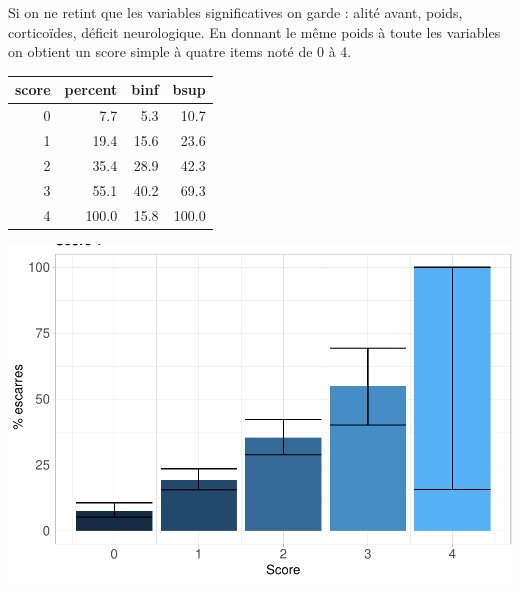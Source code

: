 \documentclass[a4paper, french]{article}
\begin{document}
Si on ne retint que les variables significatives on garde : alité avant,
poids, corticoïdes, déficit neurologique. En donnant le même poids à
toute les variables on obtient un score simple à quatre items noté de 0
à 4.

\begin{longtable}[]{@{}rrrr@{}}
\toprule
score & percent & binf & bsup\tabularnewline
\midrule
\endhead
0 & 7.7 & 5.3 & 10.7\tabularnewline
1 & 19.4 & 15.6 & 23.6\tabularnewline
2 & 35.4 & 28.9 & 42.3\tabularnewline
3 & 55.1 & 40.2 & 69.3\tabularnewline
4 & 100.0 & 15.8 & 100.0\tabularnewline
\bottomrule
\end{longtable}

\includegraphics{book_escarre_files/figure-latex/unnamed-chunk-2-1.pdf}
\end{document}
